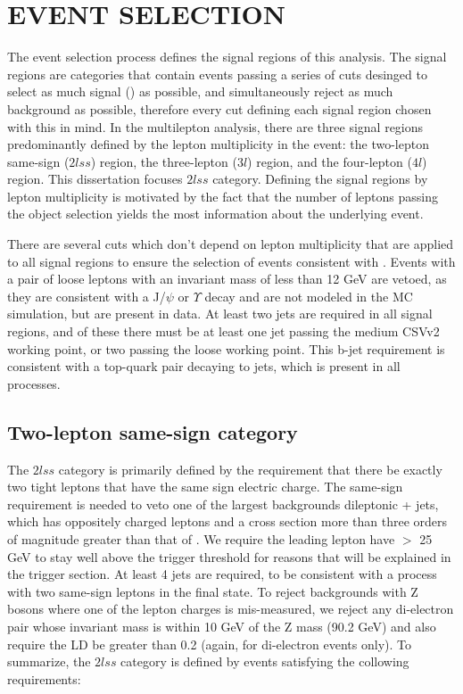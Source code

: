 %
%

\chapter{EVENT SELECTION}
\label{chap:event_selection}
The event selection process defines the signal regions of this analysis. The signal regions are categories that contain events passing a series of cuts desinged to 
select as much signal (\tth) as possible, and simultaneously reject as much background as possible, therefore every cut defining each signal region chosen with this
in mind. In the multilepton analysis, there are three signal regions predominantly defined by the lepton multiplicity in the event: the two-lepton same-sign ($2lss$) region,
the three-lepton ($3l$) region, and the four-lepton ($4l$) region. This dissertation focuses $2lss$ category. Defining the signal regions by lepton multiplicity is motivated
by the fact that the number of leptons passing the object selection yields the most information about the underlying event.

There are several cuts which don't depend on lepton multiplicity that are applied to all signal regions to ensure the selection of events consistent with \tth. Events with
a pair of loose leptons with an invariant mass of less than 12 GeV are vetoed, as they are consistent with a J/$\psi$ or $\Upsilon$ decay and are not modeled in the MC
simulation, but are present in data. At least two jets are required in all signal regions, and of these there must be at least one jet passing the medium CSVv2 working point,
or two passing the loose working point. This b-jet requirement is consistent with a top-quark pair decaying to jets, which is present in all \tth processes. 

\section{Two-lepton same-sign category}
The $2lss$ category is primarily defined by the requirement that there be exactly two tight leptons that have the same sign electric charge. The same-sign requirement is needed to veto 
one of the largest backgrounds dileptonic \ttbar + jets, which has oppositely charged leptons and a cross section more than three orders of magnitude greater than that of \tth. We require
the leading lepton have \pt $>$ 25 GeV to stay well above the trigger threshold for reasons that will be explained in the trigger section. At least 4 jets are required, to be consistent with
a \tth process with two same-sign leptons in the final state. To reject backgrounds with Z bosons where one of the lepton charges is mis-measured, we reject any di-electron pair whose invariant
mass is within 10 GeV of the Z mass (90.2 GeV) and also require the \met LD be greater than 0.2 (again, for di-electron events only). To summarize, the $2lss$ category is defined by events
satisfying the collowing requirements:

